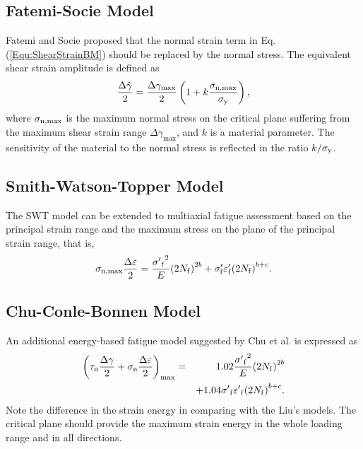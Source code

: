 \documentclass[preprint,5p,twocolumn,11pt,sort&compress]{elsarticle}
\begin{document}
\subsection{Fatemi-Socie Model}
Fatemi and Socie \cite{Fatemi1988} proposed that the normal strain term in Eq. (\ref{Equ:ShearStrainBM}) should be replaced by the normal stress.
The equivalent shear strain amplitude is defined as
\begin{equation}
\frac{{\Delta \hat \gamma }}{2} = \frac{{\Delta {\gamma _{\max }}}}{2}\left( {1 + k\frac{{{\sigma _{\rm n,\max}}}}{{{\sigma _{\rm y}}}}} \right),
\end{equation}
where
$\sigma _{\rm n,\max}$ is the maximum normal stress on the critical plane suffering from the maximum shear strain range $\Delta {\gamma _{\max}}$, and $k$ is a material parameter. The sensitivity of the material to the normal stress is reflected in the ratio $k/\sigma _{\rm y}$.

\subsection{Smith-Watson-Topper Model}
The SWT model \cite{smith1970stress} can be extended to multiaxial fatigue assessment based on the principal strain range and the maximum stress on the plane of the principal strain range, that is,
\[
{\sigma _{\rm n, \max}}\frac{{\Delta \varepsilon }}{2} = \frac{{{{\sigma '}_{\rm f}}^2}}{E}{\left( {2{N_{\rm f}}} \right)^{2b}} + {\sigma '_{\rm f}}{\varepsilon '_{\rm f}}{\left( {2{N_{\rm f}}} \right)^{b + c}}.
\]

\subsection{Chu-Conle-Bonnen Model}
An additional energy-based fatigue model suggested by Chu et al. \cite{Chu1993} is expressed as
\begin{eqnarray}
{\left( {{\tau _{\rm n}}\frac{{\Delta \gamma }}{2} + {\sigma _{\rm n }}\frac{{\Delta \varepsilon }}{2}} \right)_{\max }} &=& 1.02\frac{{{{\sigma '}_{\rm f}}^2}}{E}{\left( {2{N_{\rm f}}} \right)^{2b}} \\
&& + 1.04{{\sigma '}_{\rm f}}{{\varepsilon '}_{\rm f}}{\left( {2{N_{\rm f}}} \right)^{b + c}}.
\end{eqnarray}
Note the difference in the strain energy in comparing with the Liu's models. The critical plane should provide the maximum strain energy in the whole loading range and in all directions.
\end{document}
